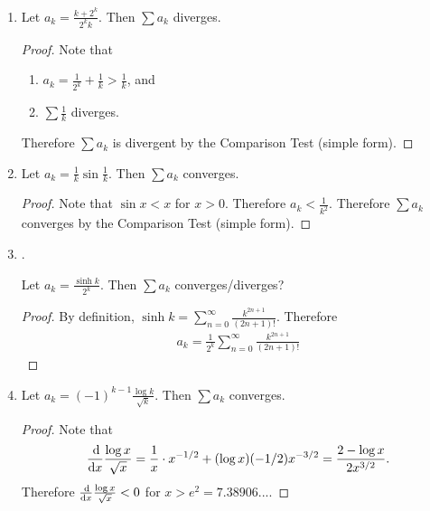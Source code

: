 \documentclass[12pt]{article}
\begin{document}
\begin{enumerate}[label=(\alph*)]
\item
  \begin{claim*}
    Let $a_k = \frac{k + 2^k}{2^kk}$. Then $\sum a_k$ diverges.
  \end{claim*}
  \begin{proof}
    Note that
    \begin{enumerate}
    \item $a_k = \frac{1}{2^k} + \frac{1}{k} > \frac{1}{k}$, and
    \item $\sum \frac{1}{k}$ diverges.
    \end{enumerate}
    Therefore $\sum a_k$ is divergent by the Comparison Test (simple form).
  \end{proof}
\item
  \begin{claim*}
    Let $a_k = \frac{1}{k}\sin\frac{1}{k}$. Then $\sum a_k$ converges.
  \end{claim*}
  \begin{proof}
    Note that $\sin x < x$ for $x > 0$. Therefore $a_k < \frac{1}{k^2}$. Therefore $\sum a_k$
    converges by the Comparison Test (simple form).
  \end{proof}
\item {}.
  \begin{claim*}
    Let $a_k = \frac{\sinh k}{2^k}$. Then $\sum a_k$ converges/diverges?
  \end{claim*}
  \begin{proof}
    By definition, $\sinh k = \sum_{n=0}^\infty \frac{k^{2n+1}}{(2n+1)!}$. Therefore
    \begin{align*}
      a_k = \frac{1}{2^k}\sum_{n=0}^\infty \frac{k^{2n+1}}{(2n+1)!}
    \end{align*}
  \end{proof}
  \newpage
\item
  \begin{claim*}
    Let $a_k = (-1)^{k-1}\frac{\log k}{\sqrt k}$. Then $\sum a_k$ converges.
  \end{claim*}

  \begin{proof}
    Note that
    \begin{align*}
      \ddx \frac{\log x}{\sqrt{x}}
      = \frac{1}{x}\cdot x^{-1/2} + (\log x)(-1/2)x^{-3/2}
      = \frac{2 - \log x}{2x^{3/2}}.
    \end{align*}
    Therefore $\ddx \frac{\log x}{\sqrt{x}} < 0$ for $x > e^2 = 7.38906...$.


\end{proof}
\end{enumerate}
\end{document}
